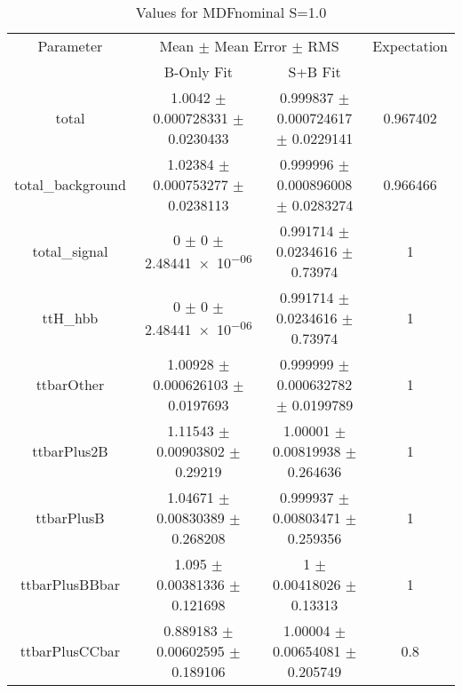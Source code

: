 \begin{table}
\centering
\caption{Values for MDFnominal S=1.0}
\begin{tabular}{cccc}
\toprule
Parameter & \multicolumn{2}{c}{Mean $\pm$ Mean Error $\pm$ RMS} & Expectation\\
 & B-Only Fit & S+B Fit & \\
\midrule
total & \num{1.0042} $\pm$ \num{0.000728331} $\pm$ \num{0.0230433} & \num{0.999837} $\pm$ \num{0.000724617} $\pm$ \num{0.0229141} & \num{0.967402}\\
total\_background & \num{1.02384} $\pm$ \num{0.000753277} $\pm$ \num{0.0238113} & \num{0.999996} $\pm$ \num{0.000896008} $\pm$ \num{0.0283274} & \num{0.966466}\\
total\_signal & \num{0} $\pm$ \num{0} $\pm$ \num{2.48441e-06} & \num{0.991714} $\pm$ \num{0.0234616} $\pm$ \num{0.73974} & \num{1}\\
ttH\_hbb & \num{0} $\pm$ \num{0} $\pm$ \num{2.48441e-06} & \num{0.991714} $\pm$ \num{0.0234616} $\pm$ \num{0.73974} & \num{1}\\
ttbarOther & \num{1.00928} $\pm$ \num{0.000626103} $\pm$ \num{0.0197693} & \num{0.999999} $\pm$ \num{0.000632782} $\pm$ \num{0.0199789} & \num{1}\\
ttbarPlus2B & \num{1.11543} $\pm$ \num{0.00903802} $\pm$ \num{0.29219} & \num{1.00001} $\pm$ \num{0.00819938} $\pm$ \num{0.264636} & \num{1}\\
ttbarPlusB & \num{1.04671} $\pm$ \num{0.00830389} $\pm$ \num{0.268208} & \num{0.999937} $\pm$ \num{0.00803471} $\pm$ \num{0.259356} & \num{1}\\
ttbarPlusBBbar & \num{1.095} $\pm$ \num{0.00381336} $\pm$ \num{0.121698} & \num{1} $\pm$ \num{0.00418026} $\pm$ \num{0.13313} & \num{1}\\
ttbarPlusCCbar & \num{0.889183} $\pm$ \num{0.00602595} $\pm$ \num{0.189106} & \num{1.00004} $\pm$ \num{0.00654081} $\pm$ \num{0.205749} & \num{0.8}\\
\bottomrule
\end{tabular}
\end{table}